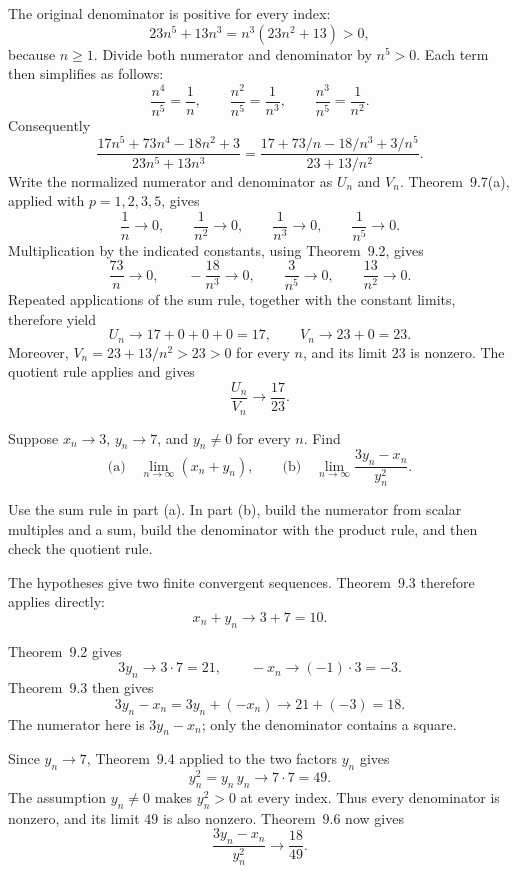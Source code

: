 The original denominator is positive for every index:
\[
 23n^5+13n^3=n^3(23n^2+13)>0,
\]
because $n\ge1$. Divide both numerator and denominator by $n^5>0$.
Each term then simplifies as follows:
\[
 \frac{n^4}{n^5}=\frac1n,
 \qquad \frac{n^2}{n^5}=\frac1{n^3},
 \qquad \frac{n^3}{n^5}=\frac1{n^2}.
\]
Consequently
\[
 \frac{17n^5+73n^4-18n^2+3}{23n^5+13n^3}
 =\frac{17+73/n-18/n^3+3/n^5}{23+13/n^2}.
\]
Write the normalized numerator and denominator as $U_n$ and $V_n$.
Theorem~9.7(a), applied with $p=1,2,3,5$, gives
\[
 \frac1n\to0,\qquad \frac1{n^2}\to0,\qquad
 \frac1{n^3}\to0,\qquad \frac1{n^5}\to0.
\]
Multiplication by the indicated constants, using Theorem~9.2, gives
\[
 \frac{73}{n}\to0,\qquad
 -\frac{18}{n^3}\to0,\qquad
 \frac3{n^5}\to0,\qquad
 \frac{13}{n^2}\to0.
\]
Repeated applications of the sum rule, together with the constant
limits, therefore yield
\[
 U_n\longrightarrow17+0+0+0=17,
 \qquad V_n\longrightarrow23+0=23.
\]
Moreover, $V_n=23+13/n^2>23>0$ for every $n$, and its limit
$23$ is nonzero. The quotient rule applies and gives
\[
 \frac{U_n}{V_n}\longrightarrow\frac{17}{23}.
\]


\goal Suppose $x_n\to3$, $y_n\to7$, and $y_n\ne0$ for every $n$.
Find
\[
 \text{(a)}\quad\lim_{n\to\infty}(x_n+y_n),
 \qquad
 \text{(b)}\quad\lim_{n\to\infty}\frac{3y_n-x_n}{y_n^2}.
\]

\idea Use the sum rule in part \textup{(a)}. In part \textup{(b)},
build the numerator from scalar multiples and a sum, build the
denominator with the product rule, and then check the quotient rule.

The hypotheses give two finite convergent sequences. Theorem~9.3
therefore applies directly:
\[
 x_n+y_n\longrightarrow3+7=10.
\]

Theorem~9.2 gives
\[
 3y_n\longrightarrow3\cdot7=21,
 \qquad -x_n\longrightarrow(-1)\cdot3=-3.
\]
Theorem~9.3 then gives
\[
 3y_n-x_n=3y_n+(-x_n)\longrightarrow21+(-3)=18.
\]
The numerator here is $3y_n-x_n$; only the denominator contains a
square.

Since $y_n\to7$, Theorem~9.4 applied to the two factors $y_n$ gives
\[
 y_n^2=y_n\,y_n\longrightarrow7\cdot7=49.
\]
The assumption $y_n\ne0$ makes $y_n^2>0$ at every index.
Thus every denominator is nonzero, and its limit $49$ is also
nonzero. Theorem~9.6 now gives
\[
 \frac{3y_n-x_n}{y_n^2}\longrightarrow\frac{18}{49}.
\]

